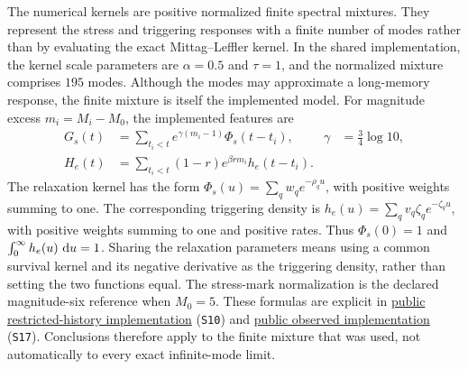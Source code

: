 The numerical kernels are positive normalized finite spectral mixtures. They represent the stress and triggering responses with a finite number of modes rather than by evaluating the exact Mittag--Leffler kernel. In the shared implementation, the kernel scale parameters are \(\alpha=0.5\) and \(\tau=1\), and the normalized mixture comprises \(195\) modes. Although the modes may approximate a long-memory response, the finite mixture is itself the implemented model. For magnitude excess \(m_i=M_i-M_0\), the implemented features are
\begin{align}
 G_s(t)&=\sum_{t_i<t} e^{\gamma(m_i-1)}\Phi_s(t-t_i),
       &\gamma&=\tfrac34\log 10,\\
 H_e(t)&=\sum_{t_i<t}(1-r)e^{\beta r m_i}h_e(t-t_i).
 \label{eq:diagnostic-features}
\end{align}
The relaxation kernel has the form \(\Phi_s(u)=\sum_qw_qe^{-\rho_qu}\), with positive weights summing to one. The corresponding triggering density is \(h_e(u)=\sum_qv_q\zeta_qe^{-\zeta_qu}\), with positive weights summing to one and positive rates. Thus \(\Phi_s(0)=1\) and \(\int_0^\infty h_e(u)\,\mathop{}\!\mathrm{d} u=1\). Sharing the relaxation parameters means using a common survival kernel and its negative derivative as the triggering density, rather than setting the two functions equal. The stress-mark normalization is the declared magnitude-six reference when \(M_0=5\). These formulas are explicit in \href{https://github.com/Drefetr/An_Evaluation_of_Earthquake_Models/blob/61aa599cd023f2441a6a0c6af9aa4b6fe9eda3e5/engine/iteration_20/code/restricted_history.py}{public restricted-history implementation} (\texttt{S10}) and \href{https://github.com/Drefetr/An_Evaluation_of_Earthquake_Models/blob/61aa599cd023f2441a6a0c6af9aa4b6fe9eda3e5/engine/iteration_27/code/adequacy.py}{public observed implementation} (\texttt{S17}). Conclusions therefore apply to the finite mixture that was used, not automatically to every exact infinite-mode limit.

